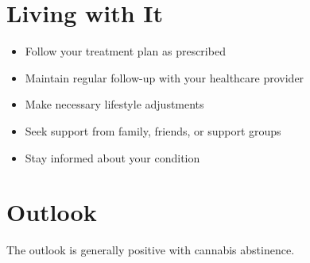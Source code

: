 \section{Living with It}
\begin{itemize}[noitemsep]
  \item Follow your treatment plan as prescribed
  \item Maintain regular follow-up with your healthcare provider
  \item Make necessary lifestyle adjustments
  \item Seek support from family, friends, or support groups
  \item Stay informed about your condition
\end{itemize}
\section{Outlook}
The outlook is generally positive with cannabis abstinence.

